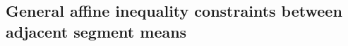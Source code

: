 \documentclass{article}
\begin{document}
\subsection{General affine inequality constraints
  between adjacent segment means}





\end{document}
